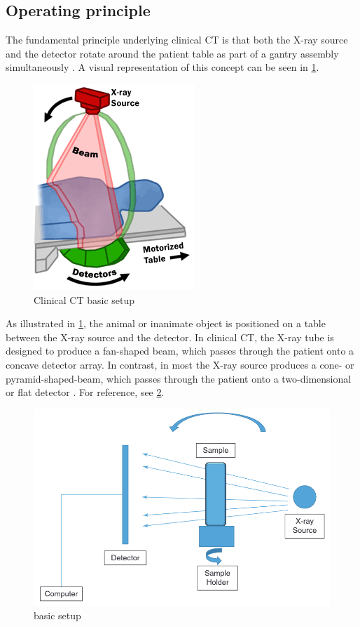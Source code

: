 \subsection{Operating principle}\label{s:b-mct-operation}
The fundamental principle underlying clinical CT is that both the X-ray source and the detector rotate around the patient table as part of a gantry assembly simultaneously \cite{flohrCTSystems2013}.
A visual representation of this concept can be seen in \cref{fig:3ct}.
\begin{figure}[h]
	\centerline{
		\includegraphics[scale=0.5]{images/ct.png}}
	\caption{Clinical CT basic setup \cite{fdaDrawingCTFan2019}}\label{fig:3ct}
\end{figure}

\noindent
As illustrated in \cref{fig:3ct}, the animal or inanimate object is positioned on a table between the X-ray source and the detector.
In clinical CT, the X-ray tube is designed to produce a fan-shaped beam, which passes through the patient onto a concave detector array.
In contrast, in most \mct\space the X-ray source produces a cone- or pyramid-shaped-beam, which passes through the patient onto a two-dimensional or flat detector \cite{babaComparisonFlatpanelDetector2002,clarkAdvancesMicroCTImaging2021}.
For reference, see \cref{fig:mct}.
\begin{figure}[h]
	\centerline{
		\includegraphics[scale=0.5]{images/mct.png}}
	\caption{\mct\space basic setup\cite{orhanMicrocomputedTomographyMicroCT2020}}\label{fig:mct}
\end{figure}

